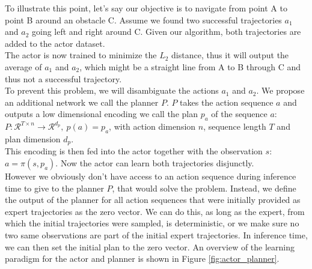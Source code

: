 To illustrate this point, let's say our objective 
is to navigate from point A to point B around an obstacle C. Assume we found two successful trajectories 
$a_1$ and $a_2$ going left and right around C. Given our algorithm, both trajectories are added to the actor dataset. \\

The actor is now trained to minimize the $L_2$ distance, thus it will output the average of $a_1$ and $a_2$, which might be a straight line from A to B 
through C and thus not a successful trajectory. \\

To prevent this problem, we will disambiguate the actions $a_1$ and $a_2$. We propose an additional network we call the planner $P$. $P$ takes 
the action sequence $a$ and outputs a low dimensional encoding we call the plan $p_a$ of the sequence $a$: 
$P:\mathcal{R}^{T\times n} \rightarrow \mathcal{R}^{d_p},\ p(a) = p_a$, with action dimension $n$, sequence length $T$ and plan dimension $d_p$.\\ 
This encoding is then fed into the actor together 
with the observation $s$: $a = \pi(s, p_a)$. Now the actor can learn both trajectories disjunctly.\\ 

However we obviously don't have access to an action sequence during inference time to give to the planner $P$, 
that would solve the problem. Instead, we define the output of the planner for all action sequences that were initially provided as 
expert trajectories as the zero vector. We can do this, as long as the expert, from which the initial trajectories were sampled, is deterministic, or we make sure 
no two same observations are part of the initial expert trajectories. In inference time, we can then set the initial plan to the zero vector. An overview of the learning 
paradigm for the actor and planner is shown in Figure \ref{fig:actor_planner}.

